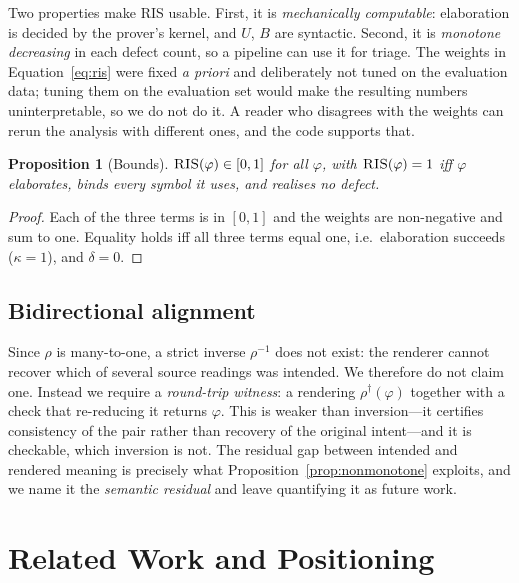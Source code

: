 \documentclass[11pt,a4paper]{article}
\theoremstyle{plain}
\newtheorem{proposition}{Proposition}
\theoremstyle{definition}
\newcommand{\RIS}{\textnormal{\textsc{RIS}}}
\begin{document}
Two properties make \RIS{} usable. First, it is \emph{mechanically
computable}: elaboration is decided by the prover's kernel, and $U$, $B$ are
syntactic. Second, it is \emph{monotone decreasing} in each defect count, so
a pipeline can use it for triage. The weights in
Equation~\eqref{eq:ris} were fixed \emph{a priori} and deliberately not
tuned on the evaluation data; tuning them on the evaluation set would make
the resulting numbers uninterpretable, so we do not do it. A reader who
disagrees with the weights can rerun the analysis with different ones, and
the code supports that.

\begin{proposition}[Bounds]
\label{prop:ris}
$\RIS(\varphi)\in[0,1]$ for all $\varphi$, with $\RIS(\varphi)=1$ iff
$\varphi$ elaborates, binds every symbol it uses, and realises no defect.
\end{proposition}

\begin{proof}
Each of the three terms is in $[0,1]$ and the weights are non-negative and
sum to one. Equality holds iff all three terms equal one, i.e.\ elaboration
succeeds ($\kappa=1$), and $\delta=0$.
\end{proof}

\subsection{Bidirectional alignment}
\label{sec:bidir}

Since $\rho$ is many-to-one, a strict inverse $\rho^{-1}$ does not exist:
the renderer cannot recover which of several source readings was intended.
We therefore do not claim one. Instead we require a
\emph{round-trip witness}: a rendering $\rho^{\dagger}(\varphi)$ together
with a check that re-reducing it returns $\varphi$. This is weaker than
inversion---it certifies consistency of the pair rather than recovery of
the original intent---and it is checkable, which inversion is not. The
residual gap between intended and rendered meaning is precisely what
Proposition~\ref{prop:nonmonotone} exploits, and we name it the
\emph{semantic residual} and leave quantifying it as future work.

\section{Related Work and Positioning}
\label{sec:related}
\end{document}
